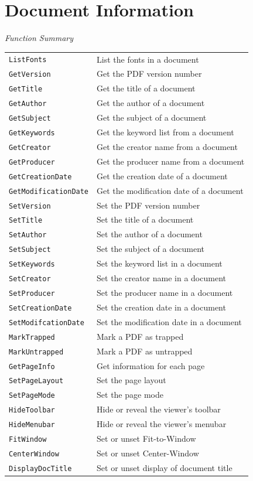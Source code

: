 \documentclass[a4paper]{memoir}
\begin{document}
\chapter{Document Information}
\begin{framed}
\noindent\textit{Function Summary}\\[2mm]
\noindent\begin{tabular}{ll}
\verb!ListFonts! & List the fonts in a document\\[5mm]
\verb!GetVersion! & Get the PDF version number\\
\verb!GetTitle! & Get the title of a document\\
\verb!GetAuthor! & Get the author of a document\\
\verb!GetSubject! & Get the subject of a document\\
\verb!GetKeywords! & Get the keyword list from a document\\
\verb!GetCreator! & Get the creator name from a document\\
\verb!GetProducer! & Get the producer name from a document\\
\verb!GetCreationDate! & Get the creation date of a document\\
\verb!GetModificationDate! & Get the modification date of a document\\[5mm]
\verb!SetVersion! & Set the PDF version number\\
\verb!SetTitle! & Set the title of a document\\
\verb!SetAuthor! & Set the author of a document\\
\verb!SetSubject! & Set the subject of a document\\
\verb!SetKeywords! & Set the keyword list in a document\\
\verb!SetCreator! & Set the creator name in a document\\
\verb!SetProducer! & Set the producer name in a document\\
\verb!SetCreationDate! & Set the creation date in a document\\
\verb!SetModifcationDate! & Set the modification date in a document\\[5mm]
\verb!MarkTrapped! & Mark a PDF as trapped\\
\verb!MarkUntrapped! & Mark a PDF as untrapped\\
\verb!GetPageInfo! & Get information for each page\\
\verb!SetPageLayout! & Set the page layout\\
\verb!SetPageMode! & Set the page mode\\
\verb!HideToolbar! & Hide or reveal the viewer's toolbar\\
\verb!HideMenubar! & Hide or reveal the viewer's menubar\\
\verb!FitWindow! & Set or unset Fit-to-Window\\
\verb!CenterWindow! & Set or unset Center-Window\\
\verb!DisplayDocTitle! & Set or unset display of document title\\[5mm]
\end{tabular}
\end{framed}
\end{document}
